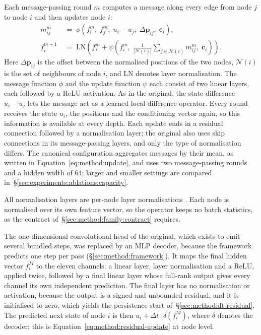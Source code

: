 Each message-passing round $m$ computes a message along every edge from
node $j$ to node $i$ and then updates node $i$:
\begin{align}
  m_{ij}^{m} &\;=\; \phi\!\left(f_i^{m},\; f_j^{m},\; u_i - u_j,\;
    \Delta\mathbf{p}_{ij},\; \mathbf{c}_i\right),
  \label{eq:method:message}\\
  f_i^{m+1} &\;=\; \mathrm{LN}\!\left(f_i^{m} + \psi\!\left(f_i^{m},\;
    \frac{1}{|\mathcal{N}(i)|}\sum_{j \in \mathcal{N}(i)} m_{ij}^{m},\;
    \mathbf{c}_i\right)\right).
  \label{eq:method:update}
\end{align}
Here $\Delta\mathbf{p}_{ij}$ is the offset between the normalised positions
of the two nodes, $\mathcal{N}(i)$ is the set of neighbours of node $i$, and
$\mathrm{LN}$ denotes layer normalisation. The message function $\phi$ and
the update function $\psi$ each consist of two linear layers, each followed
by a ReLU activation. As in the original, the state difference $u_i - u_j$
lets the message act as a learned local difference operator. Every round
receives the state $u_i$, the positions and the conditioning vector again,
so this information is available at every depth. Each update ends in a
residual connection followed by a normalisation layer; the original also
uses skip connections in its message-passing layers, and only the type of
normalisation differs. The canonical configuration aggregates messages by
their mean, as written in Equation~\eqref{eq:method:update}, and uses two
message-passing rounds and a hidden width of 64; larger and smaller
settings are compared in~\S\ref{sec:experiments:ablations:capacity}.

All normalisation layers are per-node layer normalisations
\citep{Ba2016}. Each node is normalised over its own feature vector, so the
operator keeps no batch statistics, as the contract
of~\S\ref{sec:method:family:contract} requires.

The one-dimensional convolutional head of the original, which exists to
emit several bundled steps, was replaced by an MLP decoder, because the
framework predicts one step per pass (\S\ref{sec:method:framework}). It maps the final hidden vector $f_i^{M}$ to the eleven
channels: a linear layer, layer normalisation and a ReLU, applied twice,
followed by a final linear layer whose full-rank output gives every channel
its own independent prediction. The final layer has no normalisation or
activation, because the output is a signed and unbounded residual, and it
is initialised to zero, which yields the persistence start
of~\S\ref{sec:method:dt-residual}. The predicted next state of node $i$ is
then $u_i + \Delta t \cdot \delta(f_i^{M})$, where $\delta$ denotes the
decoder; this is Equation~\eqref{eq:method:residual-update} at node level.


